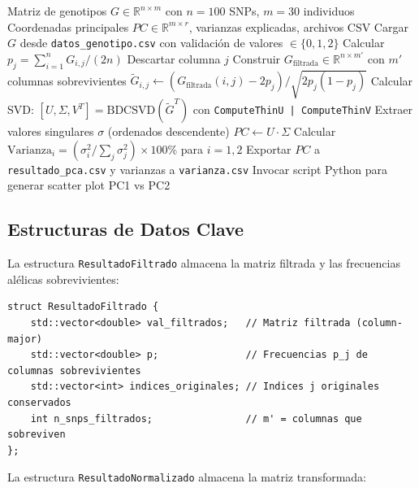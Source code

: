 \documentclass[12pt,a4paper]{article}
\theoremstyle{definition}
\newcommand{\R}{\mathbb{R}}
\begin{document}
\begin{algorithm}[H]
\caption{Pipeline PCA gen\'{e}tico mediante SVD.}
\label{alg:principal}
\begin{algorithmic}[1]
\Require Matriz de genotipos $G \in \R^{n \times m}$ con $n=100$ SNPs, $m=30$ individuos
\Ensure Coordenadas principales $PC \in \R^{m \times r}$, varianzas explicadas, archivos CSV
\State Cargar $G$ desde \texttt{datos\_genotipo.csv} con validaci\'{o}n de valores $\in \{0,1,2\}$
    \State Calcular $p_j = \sum_{i=1}^{n} G_{i,j} / (2n)$
        \State Descartar columna $j$ 
    \EndIf
\EndFor
\State Construir $G_{\text{filtrada}} \in \R^{n \times m'}$ con $m'$ columnas sobrevivientes
    \State $\tilde{G}_{i,j} \leftarrow (G_{\text{filtrada}}(i,j) - 2p_j) / \sqrt{2p_j(1-p_j)}$
\EndFor
\State Calcular SVD: $[U, \Sigma, V^T] = \text{BDCSVD}(\tilde{G}^T)$ con \texttt{ComputeThinU | ComputeThinV}
\State Extraer valores singulares $\sigma$ (ordenados descendente)
\State $PC \leftarrow U \cdot \Sigma$ 
\State Calcular $\text{Varianza}_i = (\sigma_i^2 / \sum_j \sigma_j^2) \times 100\%$ para $i=1,2$
\State Exportar $PC$ a \texttt{resultado\_pca.csv} y varianzas a \texttt{varianza.csv}
\State Invocar script Python para generar scatter plot PC1 vs PC2
\end{algorithmic}
\end{algorithm}

\subsection{Estructuras de Datos Clave}

La estructura \texttt{ResultadoFiltrado} almacena la matriz filtrada y las frecuencias al\'{e}licas sobrevivientes:

\begin{lstlisting}[caption={Estructura ResultadoFiltrado (src/procesador\_pca.hpp).}]
struct ResultadoFiltrado {
    std::vector<double> val_filtrados;   // Matriz filtrada (column-major)
    std::vector<double> p;               // Frecuencias p_j de columnas sobrevivientes
    std::vector<int> indices_originales; // Indices j originales conservados
    int n_snps_filtrados;                // m' = columnas que sobreviven
};
\end{lstlisting}

La estructura \texttt{ResultadoNormalizado} almacena la matriz transformada:
\end{document}
